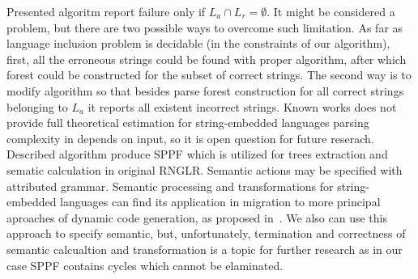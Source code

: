 Presented algoritm report failure only if $L_a \cap L_r = \emptyset$. It might be considered a problem, but there are two possible ways to overcome such limitation. 
As far as language inclusion problem is decidable (in the constraints of our algorithm), first, all the erroneous strings could be found with proper algorithm, 
after which forest could be constructed for the subset of correct strings. 
The second way is to modify algorithm so that besides parse forest construction for all correct strings belonging to $L_a$ 
it reports all existent incorrect strings.
Known works does not provide full theoretical estimation for string-embedded languages parsing complexity in depends on input, so it is open question for future reserach.
Described algorithm produce SPPF which is utilized for trees extraction and sematic calculation in original RNGLR. Semantic actions may be specified with attributed grammar.
Semantic processing and transformations for string-embedded languages can find its application in migration to more principal aproaches of dynamic code generation, as proposed in~\cite{EvalToStaged}.
We also can use this approach to specify semantic, but, unfortunately, termination and correctness of semantic calcualtion and transformation is a topic for further research 
as in our case SPPF contains cycles which cannot be elaminated. 

